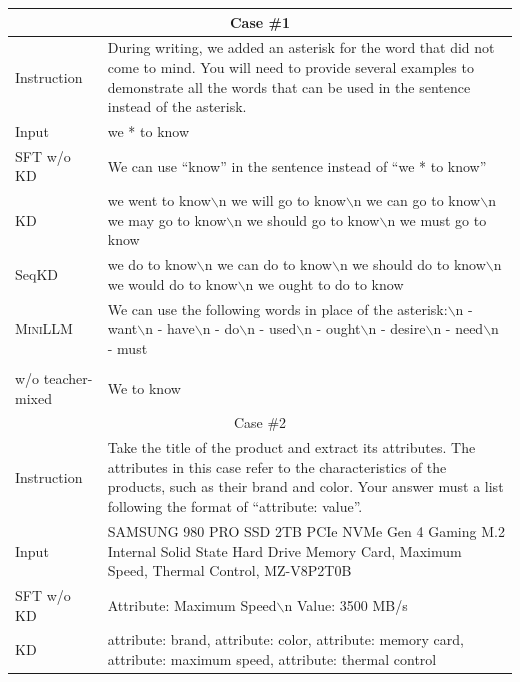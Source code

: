 \documentclass{article}
\begin{document}
\label{app:cases}
\begin{table}[t]
    \centering
    \begin{tabular}{l|p{10.3cm}}
    \toprule
    \multicolumn{2}{c}{Case \#1}          \\ \midrule
    Instruction     &  During writing, we added an asterisk for the word that did not come to mind. You will need to provide several examples to demonstrate all the words that can be used in the sentence instead of the asterisk.\\ \midrule
    Input           &  we * to know \\ \midrule \midrule
    SFT w/o KD      &  We can use ``know'' in the sentence instead of ``we * to know'' \\ \midrule
    KD              &  we went to know$\backslash$n we will go to know$\backslash$n we can go to know$\backslash$n we may go to know$\backslash$n we should go to know$\backslash$n we must go to know\\ \midrule
    SeqKD           &  we do to know$\backslash$n we can do to know$\backslash$n we should do to know$\backslash$n we would do to know$\backslash$n we ought to do to know \\ \midrule
    \textsc{MiniLLM}  &  We can use the following words in place of the asterisk:$\backslash$n - want$\backslash$n - have$\backslash$n - do$\backslash$n - used$\backslash$n - ought$\backslash$n - desire$\backslash$n - need$\backslash$n - must             \\ \midrule
    \makecell[l]{\textsc{MiniLLM} \\ w/o teacher-mixed} &  We to know \\
    \toprule
    \toprule
    \multicolumn{2}{c}{Case \#2}          \\ \midrule
    Instruction     &  Take the title of the product and extract its attributes. The attributes in this case refer to the characteristics of the products, such as their brand and color. Your answer must a list following the format of ``attribute: value''.\\ \midrule
    Input           &  SAMSUNG 980 PRO SSD 2TB PCIe NVMe Gen 4 Gaming M.2 Internal Solid State Hard Drive Memory Card, Maximum Speed, Thermal Control, MZ-V8P2T0B \\ \midrule \midrule
    SFT w/o KD      &  Attribute: Maximum Speed$\backslash$n Value: 3500 MB/s \\ \midrule
    KD              &  attribute: brand, attribute: color, attribute: memory card, attribute: maximum speed, attribute: thermal control\\ \midrule

\end{tabular}
\end{table}
\end{document}
